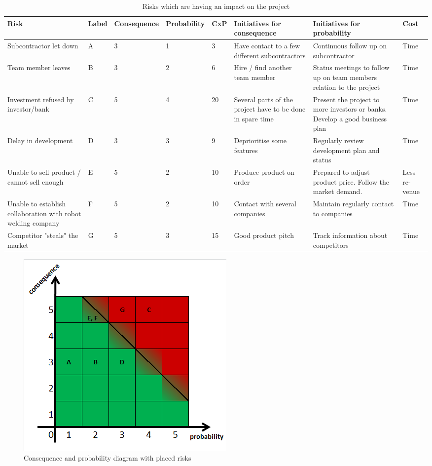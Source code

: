 \def\arraystretch{1.7}
\begin{table}[h!]
\centering
\scriptsize
\begin{tabular}{|p{2.9cm} |p{0.4cm} |p{0.9cm} |p{0.9cm} |p{0.5cm} |p{3cm} |p{3cm} |p{0.7cm}|} 
\hline
Risk 	&	La\-bel	& Conse\-quence	& Prob\-ability	& CxP	& Initiatives \newline for consequence	& Initiatives \newline for probability	& Cost \\ \hline
Subcontractor let down & A & 3 & 1 & 3 & Have contact to a few different subcontractors & Continuous follow up on subcontractor & Time\\ \hline
Team member leaves     & B & 3 & 2 & 6 & Hire / find another team member & Status meetings to follow up on team members relation to the project & Time\\ \hline
Investment refused by investor/bank & C	& 5	&	4 & 20	& Several parts of the project have to be done in spare time & Present the project to more investors or banks. Develop a good business plan & Time\\  \hline
Delay in development & D & 3 & 3 & 9 & Deprioritise some features & Regularly review development plan and status & Time\\ \hline
Unable to sell product / cannot sell enough & E & 5 & 2 & 10 & Produce product on order & Prepared to adjust product price. Follow the market demand. & Less re-\newline venue\\ \hline
Unable to establish collaboration with robot welding company & F & 5 & 2 & 10 & Contact with several companies & Maintain regularly contact to companies  & Time \\ \hline
Competitor "steals" the market & G & 5 & 3 & 15 & Good product pitch & Track information about competitors & Time\\ \hline
\end{tabular}
\caption{Risks which are having an impact on the project}
\label{riskshort}
\end{table}
\def\arraystretch{1}


\begin{figure}[h!]
\centering
\includegraphics[scale=0.6]{./graphics/cxp}
\caption{Consequence and probability diagram with placed risks}
\label{cxp}
\end{figure}

